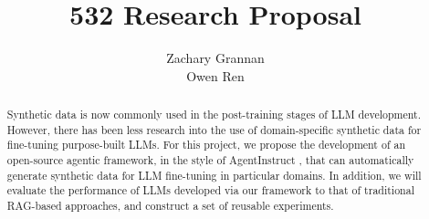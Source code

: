 \documentclass{article}
\title{532 Research Proposal}
\author{%
  Zachary Grannan \\
  \And{}
  Owen Ren
}
\begin{document}
\maketitle

\begin{abstract}
Synthetic data is now commonly used in the post-training stages of LLM
development. However, there has been less research into the use of
domain-specific synthetic data for fine-tuning purpose-built LLMs. For this
project, we propose the development of an open-source agentic framework, in the
style of AgentInstruct \citep{mitra_agentinstruct_2024}, that can automatically generate
synthetic data for LLM fine-tuning in particular domains. In addition, we will
evaluate the performance of LLMs developed via our framework to that of
traditional RAG-based approaches, and construct a set of reusable experiments.
\end{abstract}










\end{document}
